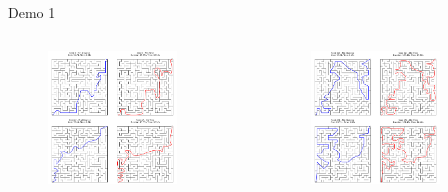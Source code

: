 \documentclass[aspectratio=169]{beamer}
\begin{document}
    
\begin{frame}{Demo 1}
    \begin{columns}[c]
        \begin{figure}
            \centering
            \includegraphics[width=0.8\textwidth]{../imgs/maze-1.png}
            \caption{}
        \end{figure}
        
        \begin{figure}
            \centering
            \includegraphics[width=0.8\textwidth]{../imgs/maze-2.png}
            \caption{}
        \end{figure}
    \end{columns}
\end{frame}
\end{document}
